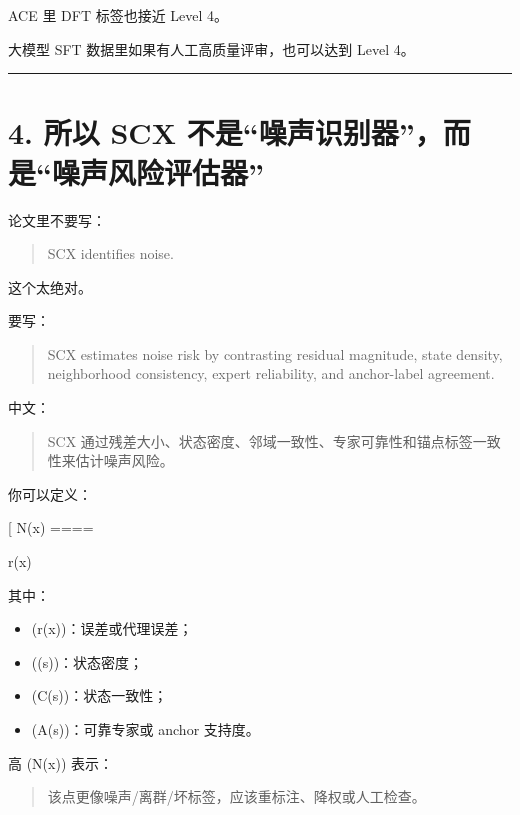 \documentclass[
  12pt,
]{ctexart}
\providecommand{\tightlist}{%
  \setlength{\itemsep}{0pt}\setlength{\parskip}{0pt}}
\begin{document}
ACE 里 DFT 标签也接近 Level 4。

大模型 SFT 数据里如果有人工高质量评审，也可以达到 Level 4。

\begin{center}\rule{0.5\linewidth}{0.5pt}\end{center}

\section{4. 所以 SCX
不是``噪声识别器''，而是``噪声风险评估器''}\label{ux6240ux4ee5-scx-ux4e0dux662fux566aux58f0ux8bc6ux522bux5668ux800cux662fux566aux58f0ux98ceux9669ux8bc4ux4f30ux5668}

论文里不要写：

\begin{quote}
SCX identifies noise.
\end{quote}

这个太绝对。

要写：

\begin{quote}
SCX estimates noise risk by contrasting residual magnitude, state
density, neighborhood consistency, expert reliability, and anchor-label
agreement.
\end{quote}

中文：

\begin{quote}
SCX
通过残差大小、状态密度、邻域一致性、专家可靠性和锚点标签一致性来估计噪声风险。
\end{quote}

你可以定义：

{[} N(x) ====

r(x) \cdot {} \cdot
[1-C(s(x))]\cdot
[1-A(s(x))]{]}

其中：

\begin{itemize}
\tightlist
\item
  (r(x))：误差或代理误差；
\item
  (\rho(s))：状态密度；
\item
  (C(s))：状态一致性；
\item
  (A(s))：可靠专家或 anchor 支持度。
\end{itemize}

高 (N(x)) 表示：

\begin{quote}
该点更像噪声/离群/坏标签，应该重标注、降权或人工检查。
\end{quote}
\end{document}
